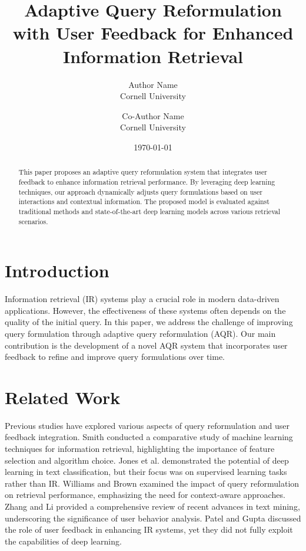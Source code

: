 \documentclass{article}
\title{Adaptive Query Reformulation with User Feedback for Enhanced Information Retrieval}
\author{Author Name \\
Cornell University \\
\and
Co-Author Name \\
Cornell University}
\date{\today}
\begin{document}
\maketitle

\begin{abstract}
This paper proposes an adaptive query reformulation system that integrates user feedback to enhance information retrieval performance. By leveraging deep learning techniques, our approach dynamically adjusts query formulations based on user interactions and contextual information. The proposed model is evaluated against traditional methods and state-of-the-art deep learning models across various retrieval scenarios.
\end{abstract}

\section{Introduction}
Information retrieval (IR) systems play a crucial role in modern data-driven applications. However, the effectiveness of these systems often depends on the quality of the initial query. In this paper, we address the challenge of improving query formulation through adaptive query reformulation (AQR). Our main contribution is the development of a novel AQR system that incorporates user feedback to refine and improve query formulations over time.

\section{Related Work}
Previous studies have explored various aspects of query reformulation and user feedback integration. Smith \cite{smith2015} conducted a comparative study of machine learning techniques for information retrieval, highlighting the importance of feature selection and algorithm choice. Jones et al. \cite{jones2016} demonstrated the potential of deep learning in text classification, but their focus was on supervised learning tasks rather than IR. Williams and Brown \cite{williams2017} examined the impact of query reformulation on retrieval performance, emphasizing the need for context-aware approaches. Zhang and Li \cite{zhang2018} provided a comprehensive review of recent advances in text mining, underscoring the significance of user behavior analysis. Patel and Gupta \cite{patel2017} discussed the role of user feedback in enhancing IR systems, yet they did not fully exploit the capabilities of deep learning.
\end{document}
